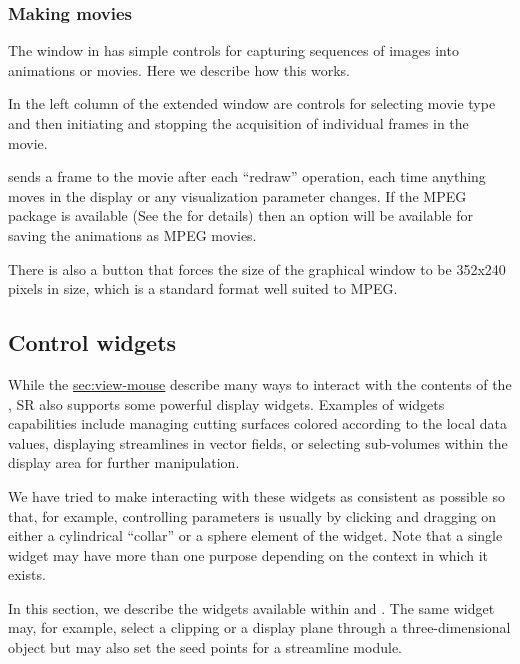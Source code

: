 \subsubsection{Making movies}
\label{sec:view-movies} 

The \viewer{} window in \SR{} has simple controls for capturing sequences
of images into animations or movies.  Here we describe how this works.

In the left column of the extended \viewer{} window are controls for
selecting movie type and then initiating and stopping the acquisition of
individual frames in the movie.

\SR{} sends a frame to the movie after each ``redraw'' operation, \ie{}
each time anything moves in the display or any visualization parameter
changes.  If the MPEG package is available (See the
 for
details) then an option will be available for saving the animations as MPEG
movies.

There is also a button that forces the size of the graphical window to be
352x240 pixels in size, which is a standard format well suited to MPEG.

\subsection{Control widgets}
\label{sec:view-widgets} 

While the \hyperref{mouse controls}{mouse controls in
Section}{}{sec:view-mouse} describe many ways to interact with the contents
of the \viewer{}, SR{} also supports some powerful display widgets.
Examples of widgets capabilities include managing cutting surfaces colored
according to the local data values, displaying streamlines in vector
fields, or selecting sub-volumes within the display area for further
manipulation. 
 
We have tried to make interacting with these widgets as consistent as
possible so that, for example, controlling parameters is usually by clicking
and dragging on either a cylindrical ``collar'' or a sphere element of the
widget.  
Note that a single widget may have more than one purpose
depending on the context in which it exists.

In this section, we describe the widgets available within \SR{} and \BIOPSE{}.
The same widget may, for example, select a clipping or a display plane
through a three-dimensional object but may also set the seed points for a
streamline module.  

